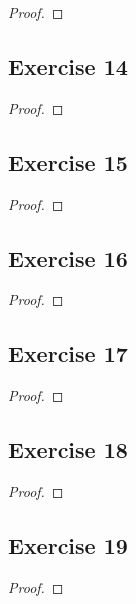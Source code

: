\documentclass[14pt]{extarticle}
\begin{document}
\begin{proof}

\end{proof}

\subsection{Exercise 14}

\begin{proof}

\end{proof}

\subsection{Exercise 15}

\begin{proof}

\end{proof}

\subsection{Exercise 16}

\begin{proof}

\end{proof}

\subsection{Exercise 17}

\begin{proof}

\end{proof}

\subsection{Exercise 18}

\begin{proof}

\end{proof}

\subsection{Exercise 19}

\begin{proof}

\end{proof}
\end{document}
